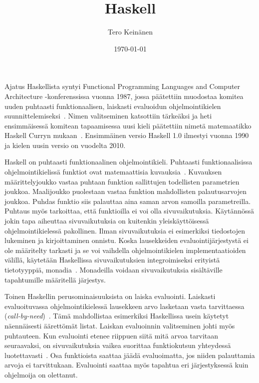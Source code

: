 \documentclass[finnish]{tktltiki2}
\title{Haskell}
\author{Tero Keinänen}
\date{\today}
\theoremstyle{definition}
\theoremstyle{remark}
\begin{document}

\frontmatter      %

\maketitle        %



\mainmatter       %


Ajatus Haskellista syntyi \foreignlanguage{english}{Functional Programming Languages and Computer Architecture} -konferenssissa vuonna 1987, jossa päätettiin muodostaa komitea uuden puhtaasti funktionaalisen, laiskasti evaluoidun ohjelmointikielen suunnittelemiseksi~\cite[s.~12-1]{Hud07}. Nimen valitseminen katsottiin tärkeäksi ja heti ensimmäisessä komitean tapaamisessa uusi kieli päätettiin nimetä matemaatikko Haskell Curryn mukaan~\cite[s.~12-4]{Hud07}.  Ensimmäinen versio Haskell 1.0 ilmestyi vuonna 1990 ja kielen uusin versio on vuodelta 2010.

Haskell on puhtaasti funktionaalinen ohjelmointikieli. Puhtaasti funktionaalisissa ohjelmointikielissä funktiot ovat matemaattisia kuvauksia~\cite[s.~1]{Sab98}. Kuvauksen määrittelyjoukko vastaa puhtaan funktion sallittujen todellisten parametrien joukkoa. Maalijoukko puolestaan vastaa funktion mahdollisten palautusarvojen joukkoa. Puhdas funktio siis palauttaa aina saman arvon samoilla parametreilla. Puhtaus myös tarkoittaa, että funktioilla ei voi olla sivuvaikutuksia. Käytännössä jokin tapa aiheuttaa sivuvaikutuksia on kuitenkin yleiskäyttöisessä ohjelmointikielessä pakollinen. Ilman sivuvaikutuksia ei esimerkiksi tiedostojen lukeminen ja kirjoittaminen onnistu. Koska lausekkeiden evaluointijärjestystä ei ole määritelty tarkasti ja se voi vaihdella ohjelmointikielen implementaatioiden välillä, käytetään Haskellissa sivuvaikutuksien integroimiseksi erityistä tietotyyppiä, monadia~\cite[luku~7]{Mar10}. Monadeilla voidaan sivuvaikutuksia sisältäville tapahtumille määritellä järjestys.

Toinen Haskellin perusominaisuuksista on laiska evaluointi. Laiskasti evaluoituvassa ohjelmointikielessä lausekkeen arvo lasketaan vasta tarvittaessa (\emph{call-by-need})~\cite[s.~12-8]{Hud07}. Tämä mahdollistaa esimerkiksi Haskellissa usein käytetyt näennäisesti äärettömät listat. Laiskan evaluoinnin valitseminen johti myös puhtauteen. Kun evaluointi etenee riippuen siitä mitä arvoa tarvitaan seuraavaksi, on sivuvaikutuksia vaikea suorittaa funktiokutsun yhteydessä luotettavasti~\cite[s.~12-8]{Hud07}. Osa funktioista saattaa jäädä evaluoimatta, jos niiden palauttamia arvoja ei tarvittukaan. Evaluointi saattaa myös tapahtua eri järjestyksessä kuin ohjelmoija on olettanut.
\end{document}
